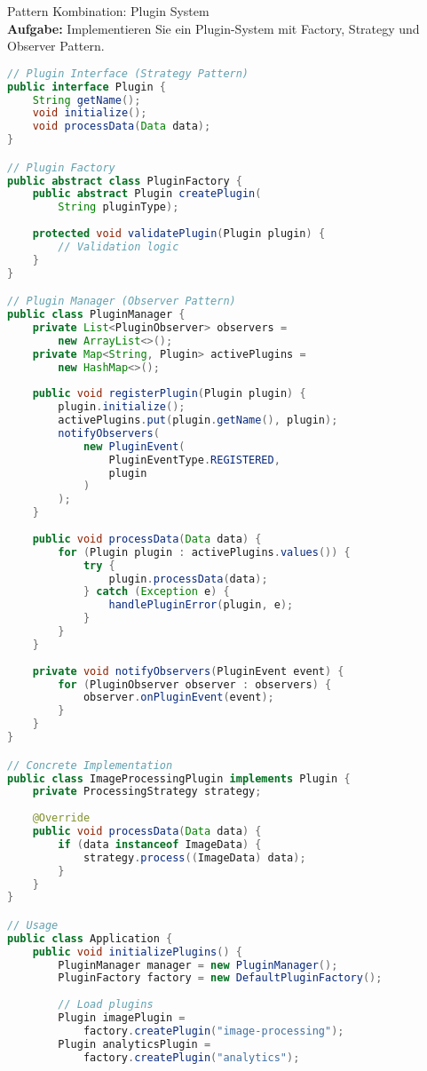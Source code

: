 \begin{example2}[breakable]{Pattern Kombination: Plugin System}\\
\textbf{Aufgabe:} Implementieren Sie ein Plugin-System mit Factory, Strategy und Observer Pattern.

\begin{lstlisting}[language=Java, style=basesmol]
// Plugin Interface (Strategy Pattern)
public interface Plugin {
    String getName();
    void initialize();
    void processData(Data data);
}

// Plugin Factory
public abstract class PluginFactory {
    public abstract Plugin createPlugin(
        String pluginType);
        
    protected void validatePlugin(Plugin plugin) {
        // Validation logic
    }
}

// Plugin Manager (Observer Pattern)
public class PluginManager {
    private List<PluginObserver> observers = 
        new ArrayList<>();
    private Map<String, Plugin> activePlugins = 
        new HashMap<>();
        
    public void registerPlugin(Plugin plugin) {
        plugin.initialize();
        activePlugins.put(plugin.getName(), plugin);
        notifyObservers(
            new PluginEvent(
                PluginEventType.REGISTERED, 
                plugin
            )
        );
    }
    
    public void processData(Data data) {
        for (Plugin plugin : activePlugins.values()) {
            try {
                plugin.processData(data);
            } catch (Exception e) {
                handlePluginError(plugin, e);
            }
        }
    }
    
    private void notifyObservers(PluginEvent event) {
        for (PluginObserver observer : observers) {
            observer.onPluginEvent(event);
        }
    }
}

// Concrete Implementation
public class ImageProcessingPlugin implements Plugin {
    private ProcessingStrategy strategy;
    
    @Override
    public void processData(Data data) {
        if (data instanceof ImageData) {
            strategy.process((ImageData) data);
        }
    }
}

// Usage
public class Application {
    public void initializePlugins() {
        PluginManager manager = new PluginManager();
        PluginFactory factory = new DefaultPluginFactory();
        
        // Load plugins
        Plugin imagePlugin = 
            factory.createPlugin("image-processing");
        Plugin analyticsPlugin = 
            factory.createPlugin("analytics");
            

\end{lstlisting}
\end{example2}
